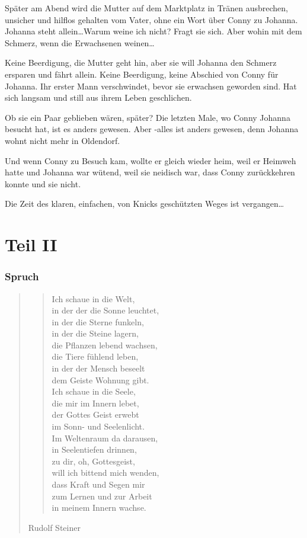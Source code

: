 \documentclass[10pt,titlepage,a5paper]{book}
\newenvironment{tg}{\begin{quote}\em}{\end{quote}}
\newenvironment{dichter}{\begin{flushright}}{\end{flushright}}
\begin{document}
Später am Abend wird die Mutter auf dem Marktplatz in Tränen ausbrechen, unsicher und hilflos gehalten vom Vater, ohne ein Wort über Conny zu Johanna. Johanna steht allein\dots Warum weine ich nicht? Fragt sie sich.
Aber wohin mit  dem Schmerz, wenn die Erwachsenen weinen\dots

Keine Beerdigung, die Mutter geht hin, aber sie will Johanna den Schmerz ersparen und fährt allein. Keine Beerdigung, keine Abschied von Conny für Johanna. Ihr erster Mann verschwindet, bevor sie erwachsen geworden sind. Hat sich langsam und still aus ihrem Leben geschlichen. 

Ob sie ein Paar geblieben wären, später? Die letzten Male, wo Conny Johanna besucht hat, ist es anders gewesen. Aber -alles ist anders gewesen, denn Johanna wohnt nicht mehr in Oldendorf. 

Und wenn Conny zu Besuch kam, wollte er gleich wieder heim, weil er Heimweh hatte und Johanna war wütend, weil sie neidisch war, dass Conny zurückkehren konnte und sie nicht. 

Die Zeit des klaren, einfachen, von Knicks geschützten Weges ist vergangen\dots


\part*{Teil II}


\section*{Spruch}


\begin{tg}
\begin{verse}
Ich schaue in die Welt,\\
in der der die Sonne leuchtet,\\
in der die Sterne funkeln,\\
in der die Steine lagern,\\
die Pflanzen lebend wachsen, \\
die Tiere fühlend leben, \\
in der der Mensch beseelt\\
dem Geiste Wohnung gibt.\\
Ich schaue in die Seele,\\
 die mir im Innern lebet, \\
der Gottes Geist erwebt\\
im Sonn- und Seelenlicht.\\
Im Weltenraum da darausen,\\
in Seelentiefen drinnen, \\
zu dir, oh, Gottesgeist,\\
will ich bittend mich wenden,\\
dass Kraft und Segen mir\\
zum Lernen und zur Arbeit\\
in meinem Innern wachse.  
\end{verse}
\begin{dichter}Rudolf Steiner\end{dichter}
\end{tg}
\end{document}

